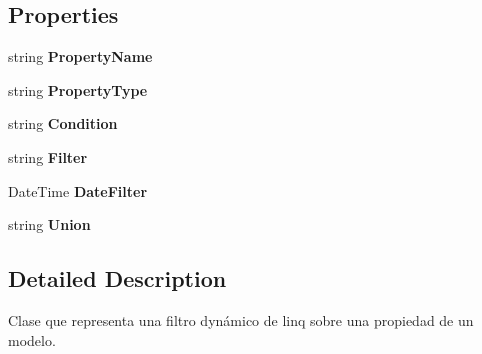 \subsection*{Properties}
\begin{DoxyCompactItemize}
\item 
\mbox{\label{class_h_k_supply_1_1_forms_1_1_model_linq_filtering_a869a28c06ec53fab6fd778bade36ea48}} 
string {\bfseries Property\+Name}
\item 
\mbox{\label{class_h_k_supply_1_1_forms_1_1_model_linq_filtering_aa017ef3e2d3751c84df6887132b49715}} 
string {\bfseries Property\+Type}
\item 
\mbox{\label{class_h_k_supply_1_1_forms_1_1_model_linq_filtering_a05bec8b82b848ed91399514fc34b5fde}} 
string {\bfseries Condition}
\item 
\mbox{\label{class_h_k_supply_1_1_forms_1_1_model_linq_filtering_ab1063badeec96c88372aac2b1d57886b}} 
string {\bfseries Filter}
\item 
\mbox{\label{class_h_k_supply_1_1_forms_1_1_model_linq_filtering_a900fece0760e7e0c290c4ccc3f2e84dd}} 
Date\+Time {\bfseries Date\+Filter}
\item 
\mbox{\label{class_h_k_supply_1_1_forms_1_1_model_linq_filtering_a8e717b94e0d388959d8b9d1e38a9fdb5}} 
string {\bfseries Union}
\end{DoxyCompactItemize}


\subsection{Detailed Description}
Clase que representa una filtro dynámico de linq sobre una propiedad de un modelo. 



